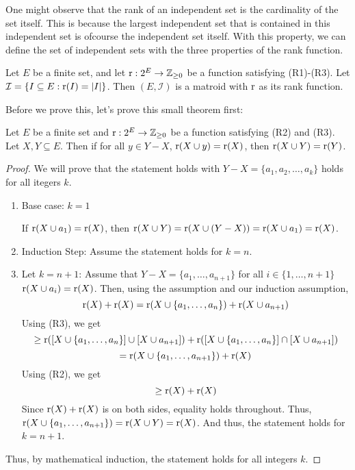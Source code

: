 One might observe that the rank of an independent set is the cardinality of the set itself. This is because the largest independent set that is contained in this independent set is ofcourse the independent set itself. With this property, we can define the set of independent sets with the three properties of the rank function.
\begin{theorem}
    Let $E$ be a finite set, and let $\operatorname{r} : 2^E \rightarrow \mathbb{Z}_{\geq0}$ be a function satisfying (R1)-(R3). Let $\mathcal{I} = \{ I\subseteq E : \operatorname{r}(I)=|I| \} $. Then $(E,\mathcal{I})$ is a matroid with $\operatorname{r}$ as its rank function.
\end{theorem}
Before we prove this, let's prove this small theorem first:
\begin{theorem}
\label{rankextension}
    Let $E$ be a finite set and $\operatorname{r}:2^E\rightarrow \mathbb{Z}_{\geq0}$ be a function satisfying (R2) and (R3). Let $X,Y\subseteq E$. Then if for all $y\in Y-X$, $\operatorname{r}(X\cup y)=\operatorname{r}(X)$, then $\operatorname{r}(X\cup Y)=\operatorname{r}(Y)$.
\end{theorem}
\begin{proof}
    We will prove that the statement holds with $Y-X = \{a_1,a_2,\dots,a_k\}$ holds for all itegers $k$.
    \begin{enumerate}
        \item Base case: $k=1$

        If $\operatorname{r}(X\cup a_1)=\operatorname{r}(X)$, then $\operatorname{r}(X\cup Y)=\operatorname{r}(X\cup(Y-X))=\operatorname{r}(X\cup a_1)=\operatorname{r}(X)$.
        \item Induction Step: Assume the statement holds for $k=n$.
        \item Let $k=n+1$: Assume that $Y-X=\{a_1,\dots,a_{n+1}\}$ for all $i\in\{1,\dots,n+1\}$ $\operatorname{r}(X\cup a_i)=\operatorname{r}(X)$. Then, using the assumption and our induction assumption, 
        $$ \operatorname{r}(X)+\operatorname{r}(X) = \operatorname{r}(X\cup \{a_1,\dots,a_n\})+\operatorname{r}(X\cup a_{n+1}) $$
        Using (R3), we get
        $$ \geq \operatorname{r}([X\cup\{a_1,\dots,a_n\}]\cup [X\cup a_{n+1}]) + \operatorname{r}([X\cup\{a_1,\dots,a_n\}]\cap [X\cup a_{n+1}]) $$
        $$ = \operatorname{r}(X\cup\{a_1,\dots,a_{n+1}\}) + \operatorname{r}(X) $$
        Using (R2), we get
        $$ \geq \operatorname{r}(X)+\operatorname{r}(X) $$
        Since $\operatorname{r}(X)+\operatorname{r}(X)$ is on both sides, equality holds throughout. Thus, $\operatorname{r}(X\cup\{a_1,\dots,a_{n+1}\})=\operatorname{r}(X\cup Y)=\operatorname{r}(X)$. And thus, the statement holds for $k=n+1$.
    \end{enumerate}
    Thus, by mathematical induction, the statement holds for all integers $k$.
\end{proof}
